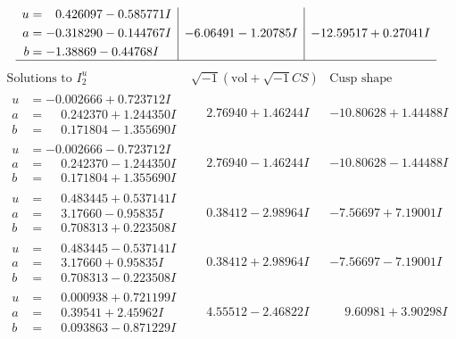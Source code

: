 \documentclass[1p]{elsarticle_modified}
\theoremstyle{definition}
\newcommand{\I}{\sqrt{-1}}
\begin{document}
$$\begin{array}{c|c|c}
\begin{aligned}
u &= \phantom{-}0.426097 - 0.585771 I \\
a &= -0.318290 - 0.144767 I \\
b &= -1.38869 - 0.44768 I\end{aligned}
 & -6.06491 - 1.20785 I & -12.59517 + 0.27041 I\\
 \hline 
 \end{array}$$\newpage$$\begin{array}{c|c|c}  
\text{Solutions to }I^u_{2}& \I (\text{vol} + \sqrt{-1}CS) & \text{Cusp shape}\\
 \hline 
\begin{aligned}
u &= -0.002666 + 0.723712 I \\
a &= \phantom{-}0.242370 + 1.244350 I \\
b &= \phantom{-}0.171804 - 1.355690 I\end{aligned}
 & \phantom{-}2.76940 + 1.46244 I & -10.80628 + 1.44488 I \\ \hline\begin{aligned}
u &= -0.002666 - 0.723712 I \\
a &= \phantom{-}0.242370 - 1.244350 I \\
b &= \phantom{-}0.171804 + 1.355690 I\end{aligned}
 & \phantom{-}2.76940 - 1.46244 I & -10.80628 - 1.44488 I \\ \hline\begin{aligned}
u &= \phantom{-}0.483445 + 0.537141 I \\
a &= \phantom{-}3.17660 - 0.95835 I \\
b &= \phantom{-}0.708313 + 0.223508 I\end{aligned}
 & \phantom{-}0.38412 - 2.98964 I & -7.56697 + 7.19001 I \\ \hline\begin{aligned}
u &= \phantom{-}0.483445 - 0.537141 I \\
a &= \phantom{-}3.17660 + 0.95835 I \\
b &= \phantom{-}0.708313 - 0.223508 I\end{aligned}
 & \phantom{-}0.38412 + 2.98964 I & -7.56697 - 7.19001 I \\ \hline\begin{aligned}
u &= \phantom{-}0.000938 + 0.721199 I \\
a &= \phantom{-}0.39541 + 2.45962 I \\
b &= \phantom{-}0.093863 - 0.871229 I\end{aligned}
 & \phantom{-}4.55512 - 2.46822 I & \phantom{-}9.60981 + 3.90298 I \\ \hline\begin{aligned}

\end{aligned}
\end{array}$$
\end{document}
